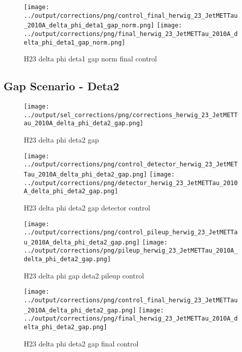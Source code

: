 \documentclass[11pt]{book}
\begin{document}
\begin{figure}[ht]
\centering
\texttt{[image: ../output/corrections/png/control\_final\_herwig\_23\_JetMETTau\_2010A\_delta\_phi\_deta1\_gap\_norm.png]}
\texttt{[image: ../output/corrections/png/final\_herwig\_23\_JetMETTau\_2010A\_delta\_phi\_deta1\_gap\_norm.png]}
\caption{H23 delta phi deta1 gap norm final control}
\label{fig:H23_JetMETTau_2010A_delta_phi_deta1_gap_norm_final_control}
\end{figure}


\clearpage
\subsection{Gap Scenario - Deta2}
\begin{figure}[ht]
\centering
\texttt{[image: ../output/sel\_corrections/png/corrections\_herwig\_23\_JetMETTau\_2010A\_delta\_phi\_deta2\_gap.png]}
\caption{H23 delta phi deta2 gap}
\label{fig:H23_JetMETTau_2010A_delta_phi_deta2_gap}
\end{figure}

\begin{figure}[ht]
\centering
\texttt{[image: ../output/corrections/png/control\_detector\_herwig\_23\_JetMETTau\_2010A\_delta\_phi\_deta2\_gap.png]}
\texttt{[image: ../output/corrections/png/detector\_herwig\_23\_JetMETTau\_2010A\_delta\_phi\_deta2\_gap.png]}
\caption{H23 delta phi deta2 gap detector control}
\label{fig:H23_JetMETTau_2010A_delta_phi_deta2_gap_detector_control}
\end{figure}

\begin{figure}[ht]
\centering
\texttt{[image: ../output/corrections/png/control\_pileup\_herwig\_23\_JetMETTau\_2010A\_delta\_phi\_deta2\_gap.png]}
\texttt{[image: ../output/corrections/png/pileup\_herwig\_23\_JetMETTau\_2010A\_delta\_phi\_deta2\_gap.png]}
\caption{H23 delta phi gap deta2 pileup control}
\label{fig:H23_JetMETTau_2010A_delta_phi_deta2_gap_pileup_control}
\end{figure}


\begin{figure}[ht]
\centering
\texttt{[image: ../output/corrections/png/control\_final\_herwig\_23\_JetMETTau\_2010A\_delta\_phi\_deta2\_gap.png]}
\texttt{[image: ../output/corrections/png/final\_herwig\_23\_JetMETTau\_2010A\_delta\_phi\_deta2\_gap.png]}
\caption{H23 delta phi deta2 gap final control}
\label{fig:H23_JetMETTau_2010A_delta_phi_deta2_gap_final_control}
\end{figure}
\end{document}
